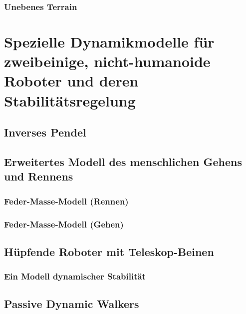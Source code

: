 \documentclass[a4paper, 11pt, accentcolor = tud3b]{tudreport}
\begin{document}
				\subsubsection{Unebenes Terrain} %

		\section{Spezielle Dynamikmodelle für zweibeinige, nicht-humanoide Roboter und deren Stabilitätsregelung} %

			\subsection{Inverses Pendel} %

			\subsection{Erweitertes Modell des menschlichen Gehens und Rennens} %

				\subsubsection{Feder-Masse-Modell (Rennen)} %

				\subsubsection{Feder-Masse-Modell (Gehen)} %

			\subsection{Hüpfende Roboter mit Teleskop-Beinen} %

				\subsubsection{Ein Modell dynamischer Stabilität} %

			\subsection{Passive Dynamic Walkers} %
\end{document}
